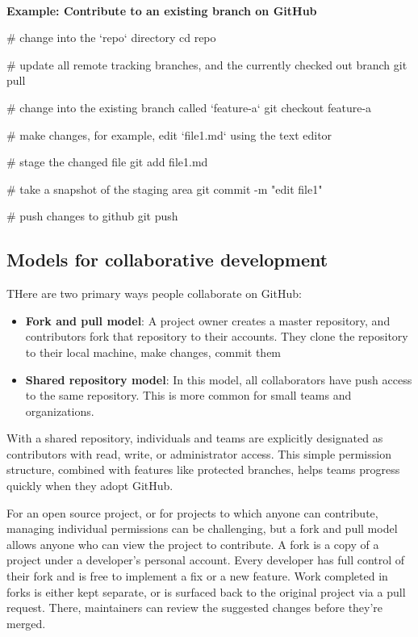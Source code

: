 \textbf{\\ Example: Contribute to an existing branch on GitHub}
\begin{codeblock}[language=bash]
# change into the `repo` directory
cd repo

# update all remote tracking branches, and the currently checked out branch
git pull

# change into the existing branch called `feature-a`
git checkout feature-a

# make changes, for example, edit `file1.md` using the text editor

# stage the changed file
git add file1.md

# take a snapshot of the staging area
git commit -m "edit file1"

# push changes to github
git push
\end{codeblock}

\subsection{Models for collaborative development}

THere are two primary ways people collaborate on GitHub:
\begin{itemize}
    \item \textbf{Fork and pull model}: A project owner creates a master repository, and contributors fork that repository to their accounts. They clone the repository to their local machine, make changes, commit them
    \item \textbf{Shared repository model}: In this model, all collaborators have push access to the same repository. This is more common for small teams and organizations.
\end{itemize}

With a shared repository, individuals and teams are explicitly designated as contributors with read, write, or administrator access. This simple permission structure, combined with features like protected branches, helps teams progress quickly when they adopt GitHub.

For an open source project, or for projects to which anyone can contribute, managing individual permissions can be challenging, but a fork and pull model allows anyone who can view the project to contribute. A fork is a copy of a project under a developer's personal account. Every developer has full control of their fork and is free to implement a fix or a new feature. Work completed in forks is either kept separate, or is surfaced back to the original project via a pull request. There, maintainers can review the suggested changes before they're merged. 

